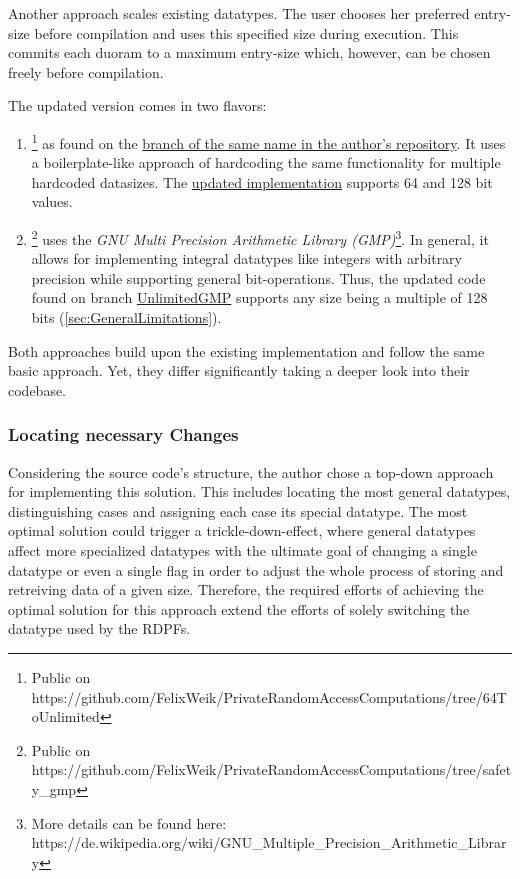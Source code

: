 \label{sub:IncreasingTheSizeOfExistingDPFs}
Another approach scales existing datatypes.
The user chooses her preferred entry-size before compilation and uses this specified size during execution.
This commits each duoram to a maximum entry-size which, however, can be chosen freely before compilation.

The updated version comes in two flavors:
\begin{enumerate}
    \item {}\footnote{Public on https://github.com/FelixWeik/PrivateRandomAccessComputations/tree/64ToUnlimited} as found on the \hyperlink{https://github.com/FelixWeik/PrivateRandomAccessComputations/tree/64ToUnlimited}{branch of the same name in the author's repository}.
    It uses a boilerplate-like approach of hardcoding the same functionality for multiple hardcoded datasizes.
    The \hyperlink{https://github.com/FelixWeik/PrivateRandomAccessComputations/tree/64ToUnlimited}{updated implementation} supports 64 and 128 bit values.
    \item {}\footnote{Public on https://github.com/FelixWeik/PrivateRandomAccessComputations/tree/safety\_gmp} uses the \textit{GNU Multi Precision Arithmetic Library (GMP)}\footnote{More details can be found here: https://de.wikipedia.org/wiki/GNU\_Multiple\_Precision\_Arithmetic\_Library}.
    In general, it allows for implementing integral datatypes like integers with arbitrary precision while supporting general bit-operations.
    Thus, the updated code found on branch \hyperlink{https://github.com/FelixWeik/PrivateRandomAccessComputations/tree/UnlimitedGMP}{UnlimitedGMP} supports any size being a multiple of 128 bits (\ref{sec:GeneralLimitations}).
\end{enumerate}

Both approaches build upon the existing implementation and follow the same basic approach.
Yet, they differ significantly taking a deeper look into their codebase.

\subsubsection*{Locating necessary Changes} \label{subsub:necessaryChanges}
Considering the source code's structure, the author chose a top-down approach for implementing this solution.
This includes locating the most general datatypes, distinguishing cases and assigning each case its special datatype.
The most optimal solution could trigger a trickle-down-effect, where general datatypes affect more specialized datatypes with the ultimate goal of changing a single datatype or even a single flag in order to adjust the whole process of storing and retreiving data of a given size.
Therefore, the required efforts of achieving the optimal solution for this approach extend the efforts of solely switching the datatype used by the RDPFs.

